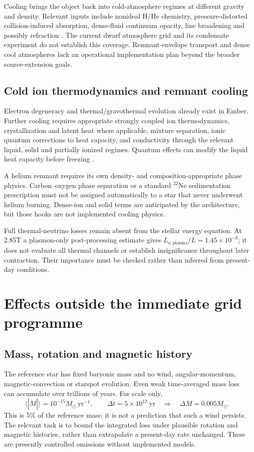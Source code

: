 \documentclass[11pt,letterpaper]{article}
\newcommand{\Ms}{M_\odot}
\begin{document}
Cooling brings the object back into cold-atmosphere regimes at different
gravity and density. Relevant inputs include nonideal H/He chemistry,
pressure-distorted collision-induced absorption, dense-fluid continuum opacity,
line broadening and possibly refraction \cite{blouin18}. The current dwarf
atmosphere grid and its condensate experiment do not establish this coverage.
Remnant-envelope transport and dense cool atmospheres lack an operational
implementation plan beyond the broader source-extension goals.

\subsection{Cold ion thermodynamics and remnant cooling}
Electron degeneracy and thermal/gravothermal evolution already exist in Ember.
Further cooling requires appropriate strongly coupled ion thermodynamics,
crystallization and latent heat where applicable, mixture separation, ionic
quantum corrections to heat capacity, and conductivity through the relevant
liquid, solid and partially ionized regimes. Quantum effects can modify the
liquid heat capacity before freezing \cite{baiko19}.

A helium remnant requires its own density- and composition-appropriate phase
physics. Carbon--oxygen phase separation or a standard $^{22}$Ne sedimentation
prescription must not be assigned automatically to a star that never underwent
helium burning. Dense-ion and solid terms are anticipated by the architecture,
but those hooks are not implemented cooling physics.

Full thermal-neutrino losses remain absent from the stellar energy equation.
At 2.85T a plasmon-only post-processing estimate gives
$L_{\nu,\mathrm{plasma}}/L=1.45\times10^{-8}$; it does not evaluate all thermal
channels or establish insignificance throughout later contraction. Their
importance must be checked rather than inferred from present-day conditions.

\section{Effects outside the immediate grid programme}
\subsection{Mass, rotation and magnetic history}
The reference star has fixed baryonic mass and no wind, angular-momentum,
magnetic-convection or starspot evolution. Even weak time-averaged mass loss
can accumulate over trillions of years. For scale only,
\[
 \langle |\dot M|\rangle=10^{-15}\Ms\,\mathrm{yr}^{-1},\qquad
 \Delta t=5\times10^{12}\ \mathrm{yr}
 \quad\Longrightarrow\quad \Delta M=0.005\Ms.
\]
This is 5\% of the reference mass; it is not a prediction that such a wind
persists. The relevant task is to bound the integrated loss under plausible
rotation and magnetic histories, rather than extrapolate a present-day rate
unchanged. These are presently controlled omissions without implemented models.
\end{document}
